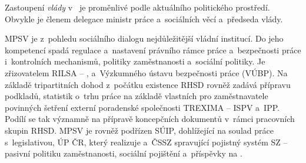 Zastoupení \textit{vlády} v~ je proměnlivé podle aktuálního politického prostředí. Obvykle je členem delegace ministr práce a~sociálních věcí a~předseda vlády.\par
\Ac{MPSV} je z~pohledu sociálního dialogu nejdůležitější vládní institucí. Do jeho kompetencí spadá regulace a~nastavení právního rámce práce a~bezpečnosti práce i~kontrolních mechanismů, politiky zaměstnanosti a~sociální politiky. Je zřizovatelem RILSA -- , a~Výzkumného ústavu bezpečnosti práce (VÚBP). Na základě tripartitních dohod z~počátku existence \ac{RHSD} rovněž zadává přípravu podkladů, statistik o~trhu práce na základě vlastních pro zaměstnavatele povinných šetření externí poradenské společnosti TREXIMA -- \Ac{ISPV} a~\ac{IPP}. Podílí se tak významně na přípravě koncepčních dokumentů v~rámci pracovních skupin \ac{RHSD}.
\Ac{MPSV} je rovněž podřízen \ac{SÚIP}, dohlížející na soulad práce s~legislativou, \ac{ÚP ČR}, který realizuje  a~\ac{ČSSZ} spravující pojistný systém \ac{SZ} -- pasivní politiku zaměstnanosti, sociální pojištění a~příspěvky na .\par

